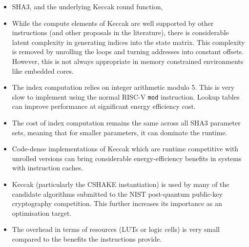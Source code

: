 \begin{description}
      \begin{itemize}
      \item SHA3, and the underlying Keccak round function,
      \item While the compute elements of Keccak are well supported by other
            \XCID instructions (and other proposals in the literature), there
            is considerable latent complexity in generating indices into
            the state matrix.
            This complexity is removed by unrolling the loops and
            turning addresses into constant offsets. However, this is not
            always appropriate in memory constrained environments like embedded
            cores.
      \item The index computation relies on integer arithmetic modulo 5. This
            is very slow to implement using the normal RISC-V {\tt mod} instruction.
            Lookup tables can improve performance at significant energy efficiency cost.
      \item The cost of index computation remains the same across all SHA3 parameter
            sets, meaning that for smaller parameters, it can dominate the runtime.
      \item Code-dense implementations of Keccak which are runtime competitive
            with unrolled versions can bring considerable energy-efficiency
            benefits in systems with instruction caches.
      \item Keccak (particularly the CSHAKE instantiation) is used by many of the
            candidate algorithms submitted to the NIST post-quantum public-key
            cryptography competition. This further increases its importance as
            an optimisation target.
      \item The overhead in terms of resources (LUTs or logic cells) is very
            small compared to the benefits the instructions provide.
      \end{itemize}

\end{description}

